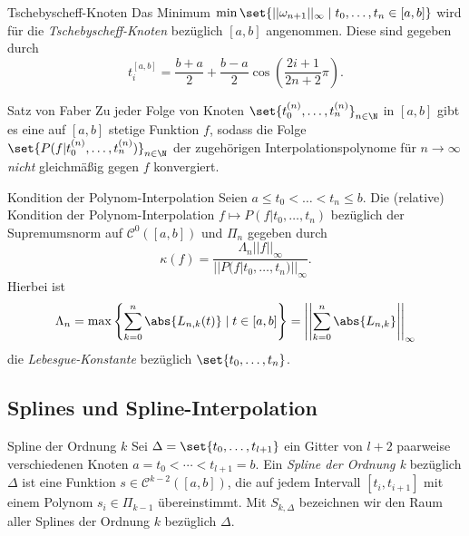 \begin{karte}{Tschebyscheff-Knoten}
	Das Minimum \( \min\set{|| \omega_{n+1}||_\infty \;|\; t_0, \ldots, t_n \in [a,b] } \)
	wird für die \textit{Tschebyscheff-Knoten} bezüglich \([a,b]\) angenommen.
	Diese sind gegeben durch
	\[ t_i^{[a,b]} = \frac{b+a}{2} + \frac{b-a}{2} \cos\left( \frac{2i + 1}{2n + 2} \pi \right). \]
\end{karte}

\begin{karte}{Satz von Faber}
	Zu jeder Folge von Knoten \( \set{t_0^{(n)}, \ldots, t_n^{(n)} }_{n\in\N} \) 
	in \( [a,b] \) gibt es eine auf \( [a,b] \) stetige Funktion \( f \), sodass 
	die Folge \( \set{P(f|t_0^{(n)}, \ldots, t_n^{(n)})}_{n\in\N} \) der zugehörigen 
	Interpolationspolynome für \( n\rightarrow \infty \) \textit{nicht} gleichmäßig gegen \(f\) konvergiert.
\end{karte}

\begin{karte}{Kondition der Polynom-Interpolation}
	Seien \( a \leq t_0 < \ldots < t_n \leq b \). Die (relative) Kondition 
	der Polynom-Interpolation \( f \mapsto P(f|t_0,\ldots, t_n) \) bezüglich der 
	Supremumsnorm auf \( \mathcal{C}^0([a,b]) \) und \( \Pi_n \) gegeben durch 
	\[ \kappa(f) = \frac{ \Lambda_n ||f||_\infty }{ || P(f|t_0,\ldots, t_n) ||_\infty }. \]
	Hierbei ist 
	\[ \Lambda_n = \max\left\{ \sum_{k=0}^n \abs{L_{n,k}(t)} \;|\; t\in [a,b] \right\}
	= \left|\left| \sum_{k=0}^n \abs{L_{n,k}} \right|\right|_\infty \]
	die \textit{Lebesgue-Konstante} bezüglich \( \set{t_0, \ldots, t_n} \).
\end{karte}

\subsection*{Splines und Spline-Interpolation}

\begin{karte}{Spline der Ordnung \(k\)}
	Sei \( \Delta = \set{t_0, \ldots, t_{l+1}} \) ein Gitter von \( l+2 \) 
	paarweise verschiedenen Knoten \( a = t_0 < \cdots < t_{l+1} = b \). 
	Ein \textit{Spline der Ordnung k} bezüglich \( \Delta \) ist eine Funktion 
	\( s \in \mathcal{C}^{k-2}([a,b]) \), die auf jedem Intervall \( [t_i, t_{i+1}] \) 
	mit einem Polynom \( s_i \in \Pi_{k-1} \) übereinstimmt. Mit \( S_{k, \Delta} \) 
	bezeichnen wir den Raum aller Splines der Ordnung \( k \) bezüglich \( \Delta \).
\end{karte}

